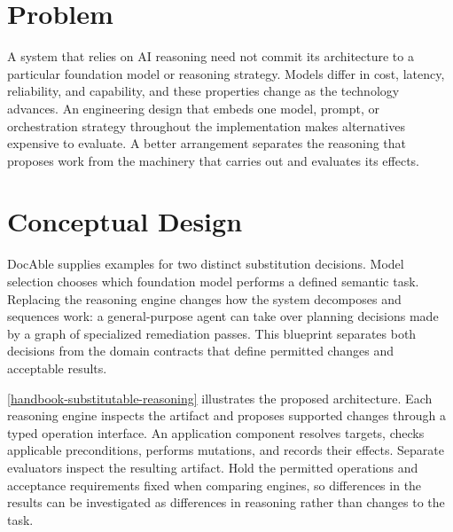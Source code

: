 
\section{Problem}\label{heading:problem}

A system that relies on AI reasoning need not commit its architecture to a particular foundation model or reasoning strategy. Models differ in cost, latency, reliability, and capability, and these properties change as the technology advances. An engineering design that embeds one model, prompt, or orchestration strategy throughout the implementation makes alternatives expensive to evaluate. A better arrangement separates the reasoning that proposes work from the machinery that carries out and evaluates its effects.

\section{Conceptual Design}\label{heading:conceptual-design}

DocAble supplies examples for two distinct substitution decisions. Model selection chooses which foundation model performs a defined semantic task. Replacing the reasoning engine changes how the system decomposes and sequences work: a general-purpose agent can take over planning decisions made by a graph of specialized remediation passes. This blueprint separates both decisions from the domain contracts that define permitted changes and acceptable results.

\autoref{handbook-substitutable-reasoning} illustrates the proposed architecture. Each reasoning engine inspects the artifact and proposes supported changes through a typed operation interface. An application component resolves targets, checks applicable preconditions, performs mutations, and records their effects. Separate evaluators inspect the resulting artifact. Hold the permitted operations and acceptance requirements fixed when comparing engines, so differences in the results can be investigated as differences in reasoning rather than changes to the task.

